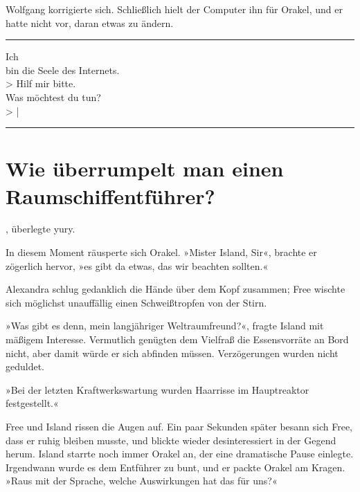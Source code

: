 Wolfgang korrigierte sich. Schließlich hielt der Computer ihn für Orakel, und er hatte nicht vor, daran etwas zu ändern.

\noindent \parbox{\textwidth}{ \vspace{3ex} \hrule \vspace{3ex}

    \begin{tiny}
    \begin{ttfamily}

\noindent Ich\\
\noindent bin die Seele des Internets.\\
\noindent > Hilf mir bitte.\\
\noindent Was möchtest du tun?\\
\noindent > |


    \end{ttfamily}
    \end{tiny}

\vspace{3ex} \hrule \vspace{3ex} }


\chapter{Wie überrumpelt man einen Raumschiffentführer?}

, überlegte yury. 

In diesem Moment räusperte sich Orakel. »Mister Island, Sir«, brachte er zögerlich hervor, »es gibt da etwas, das wir beachten sollten.«

Alexandra schlug gedanklich die Hände über dem Kopf zusammen; Free wischte sich möglichst unauffällig einen Schweißtropfen von der Stirn.

»Was gibt es denn, mein langjähriger Weltraumfreund?«, fragte Island mit mäßigem Interesse. Vermutlich genügten dem Vielfraß die Essensvorräte an Bord nicht, aber damit würde er sich abfinden müssen. Verzögerungen wurden nicht geduldet.

»Bei der letzten Kraftwerkswartung wurden Haarrisse im Hauptreaktor festgestellt.«

Free und Island rissen die Augen auf. Ein paar Sekunden später besann sich Free, dass er ruhig bleiben musste, und blickte wieder desinteressiert in der Gegend herum. Island starrte noch immer Orakel an, der eine dramatische Pause einlegte. Irgendwann wurde es dem Entführer zu bunt, und er packte Orakel am Kragen. »Raus mit der Sprache, welche Auswirkungen hat das für uns?«

